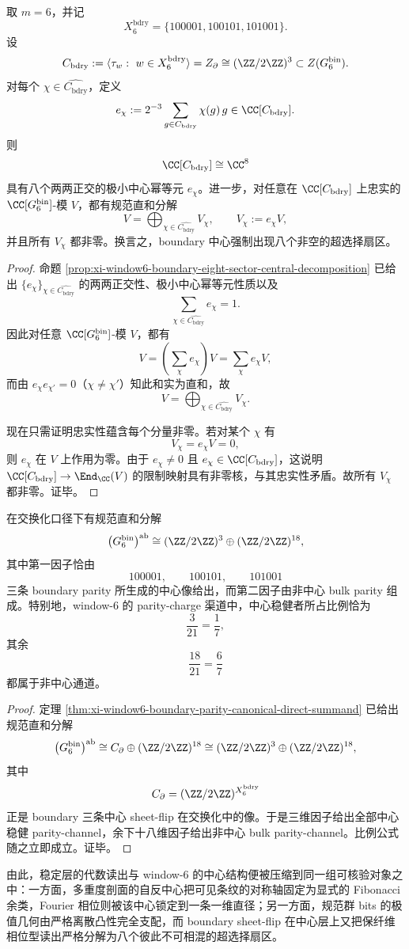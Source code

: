 \begin{theorem}\label{thm:xi-time-part60ab2-window6-boundary-eight-superselection}
取 \(m=6\)，并记
\[
X_6^{\mathrm{bdry}}=\{100001,100101,101001\}.
\]
设
\[
C_{\mathrm{bdry}}
:=
\langle \tau_w:\ w\in X_6^{\mathrm{bdry}}\rangle
=
Z_{\partial}
\cong
(\ZZ/2\ZZ)^3
\subset Z(G_6^{\mathrm{bin}}).
\]
对每个 \(\chi\in \widehat{C_{\mathrm{bdry}}}\)，定义
\[
e_\chi:=2^{-3}\sum_{g\in C_{\mathrm{bdry}}}\chi(g)\,g
\in \CC[C_{\mathrm{bdry}}].
\]
则
\[
\CC[C_{\mathrm{bdry}}]\cong \CC^{8}
\]
具有八个两两正交的极小中心幂等元 \(e_\chi\)。进一步，对任意在 \(\CC[C_{\mathrm{bdry}}]\) 上忠实的 \(\CC[G_6^{\mathrm{bin}}]\)-模 \(V\)，都有规范直和分解
\[
V=\bigoplus_{\chi\in \widehat{C_{\mathrm{bdry}}}}V_\chi,
\qquad
V_\chi:=e_\chi V,
\]
并且所有 \(V_\chi\) 都非零。换言之，boundary 中心强制出现八个非空的超选择扇区。
\end{theorem}
\begin{proof}
命题 \ref{prop:xi-window6-boundary-eight-sector-central-decomposition} 已给出 \(\{e_\chi\}_{\chi\in\widehat{C_{\mathrm{bdry}}}}\) 的两两正交性、极小中心幂等元性质以及
\[
\sum_{\chi\in\widehat{C_{\mathrm{bdry}}}}e_\chi=1.
\]
因此对任意 \(\CC[G_6^{\mathrm{bin}}]\)-模 \(V\)，都有
\[
V=\left(\sum_{\chi}e_\chi\right)V=\sum_{\chi}e_\chi V,
\]
而由 \(e_\chi e_{\chi'}=0\)（\(\chi\neq\chi'\)）知此和实为直和，故
\[
V=\bigoplus_{\chi\in\widehat{C_{\mathrm{bdry}}}}V_\chi.
\]

现在只需证明忠实性蕴含每个分量非零。若对某个 \(\chi\) 有
\[
V_\chi=e_\chi V=0,
\]
则 \(e_\chi\) 在 \(V\) 上作用为零。由于 \(e_\chi\neq 0\) 且 \(e_\chi\in \CC[C_{\mathrm{bdry}}]\)，这说明 \(\CC[C_{\mathrm{bdry}}]\to \End_{\CC}(V)\) 的限制映射具有非零核，与其忠实性矛盾。故所有 \(V_\chi\) 都非零。证毕。
\end{proof}

\begin{corollary}\label{cor:xi-time-part60ab2-window6-central-bulk-parity-splitting-ratio}
在交换化口径下有规范直和分解
\[
\bigl(G_6^{\mathrm{bin}}\bigr)^{\mathrm{ab}}
\cong
(\ZZ/2\ZZ)^3\oplus (\ZZ/2\ZZ)^{18},
\]
其中第一因子恰由
\[
100001,\qquad 100101,\qquad 101001
\]
三条 boundary parity 所生成的中心像给出，而第二因子由非中心 bulk parity 组成。特别地，window-\(6\) 的 parity-charge 渠道中，中心稳健者所占比例恰为
\[
\frac{3}{21}=\frac17,
\]
其余
\[
\frac{18}{21}=\frac67
\]
都属于非中心通道。
\end{corollary}
\begin{proof}
定理 \ref{thm:xi-window6-boundary-parity-canonical-direct-summand} 已给出规范直和分解
\[
\bigl(G_6^{\mathrm{bin}}\bigr)^{\mathrm{ab}}
\cong
C_{\partial}\oplus (\ZZ/2\ZZ)^{18}
\cong
(\ZZ/2\ZZ)^3\oplus(\ZZ/2\ZZ)^{18},
\]
其中
\[
C_{\partial}=(\ZZ/2\ZZ)^{X_6^{\mathrm{bdry}}}
\]
正是 boundary 三条中心 sheet-flip 在交换化中的像。于是三维因子给出全部中心稳健 parity-channel，余下十八维因子给出非中心 bulk parity-channel。比例公式随之立即成立。证毕。
\end{proof}

\noindent
由此，稳定层的代数读出与 window-\(6\) 的中心结构便被压缩到同一组可核验对象之中：一方面，多重度剖面的自反中心把可见条纹的对称轴固定为显式的 Fibonacci 余类，Fourier 相位则被该中心锁定到一条一维直径；另一方面，规范群 bits 的极值几何由严格离散凸性完全支配，而 boundary sheet-flip 在中心层上又把保纤维相位型读出严格分解为八个彼此不可相混的超选择扇区。

\endinput
